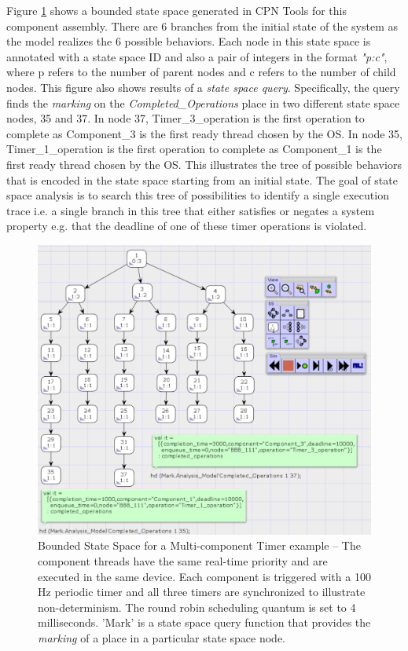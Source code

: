Figure \ref{fig:SSScreenshot} shows a bounded state space generated in CPN Tools for this component assembly. There are 6 branches from the initial state of the system as the model realizes the 6 possible behaviors. Each node in this state space is annotated with a state space ID and also a pair of integers in the format \emph{"p:c"}, where p refers to the number of parent nodes and c refers to the number of child nodes. This figure also shows results of a \emph{state space query}. Specifically, the query finds the \emph{marking} on the \emph{Completed\_Operations} place in two different state space nodes, 35 and 37. In node 37, Timer\_3\_operation is the first operation to complete as Component\_3 is the first ready thread chosen by the OS. In node 35, Timer\_1\_operation is the first operation to complete as Component\_1 is the first ready thread chosen by the OS. This illustrates the tree of possible behaviors that is encoded in the state space starting from an initial state. The goal of state space analysis is to search this tree of possibilities to identify a single execution trace i.e. a single branch in this tree that either satisfies or negates a system property e.g. that the deadline of one of these timer operations is violated. 


\begin{figure}[htb]
	\centering
	\includegraphics[width=\textwidth]{./img/state-space-analysis.png}
	\caption{Bounded State Space for a Multi-component Timer example -- The component threads have the same real-time priority and are executed in the same device. Each component is triggered with a 100 Hz periodic timer and all three timers are synchronized to illustrate non-determinism. The round robin  scheduling quantum is set to 4 milliseconds. 'Mark' is a state space query function that provides the \emph{marking} of a place in a particular state space node.}
	\label{fig:SSScreenshot}
\end{figure}
\FloatBarrier

